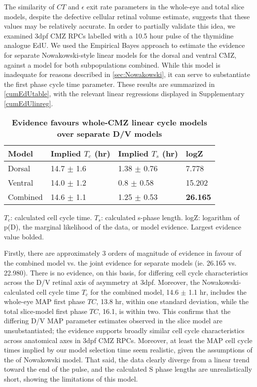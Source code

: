 The similarity of $CT$ and $\epsilon$ exit rate parameters in the whole-eye and total slice models, despite the defective cellular retinal volume estimate, suggests that these values may be relatively accurate. In order to partially validate this idea, we examined 3dpf CMZ RPCs labelled with a 10.5 hour pulse of the thymidine analogue EdU. We used the Empirical Bayes approach to estimate the evidence for separate Nowakowski-style \cite{Nowakowski1989} linear models for the dorsal and ventral CMZ, against a model for both subpopulations combined. While this model is inadequate for reasons described in \autoref{sec:Nowakowski}, it can serve to substantiate the first phase cycle time parameter. These results are summarized in \autoref{cumEdUtable}, with the relevant linear regressions displayed in Supplementary \autoref{cumEdUlinreg}.

\begin{table}[!ht]
    \centering
    \caption{{\bf Evidence favours whole-CMZ linear cycle models over separate D/V models}}
    \begin{tabular}{|l|l|l|l|} 
        \hline {\bf Model} & {\bf Implied $T_c$ (hr)} & {\bf Implied $T_s$ (hr)} & {\bf logZ}\\ \hline 
        Dorsal & 14.7 $\pm$ 1.6 & 1.38 $\pm$ 0.76 & 7.778\\ \hline 
        Ventral & 14.0 $\pm$ 1.2 & 0.8 $\pm$ 0.58 & 15.202\\ \hline
        Combined & 14.6 $\pm$ 1.1 & 1.25 $\pm$ 0.53 & {\bf26.165}\\ \hline
    \end{tabular}
   
    \begin{flushleft} $T_c$: calculated cell cycle time. $T_s$: calculated s-phase length. logZ: logarithm of p(D), the marginal likelihood of the data, or model evidence.  Largest evidence value bolded.
    \end{flushleft}
    \label{cumEdUtable}
\end{table}

Firstly, there are approximately 3 orders of magnitude of evidence in favour of the combined model vs. the joint evidence for separate models (ie. 26.165 vs. 22.980). There is no evidence, on this basis, for differing cell cycle characteristics across the D/V retinal axis of asymmetry at 3dpf. Moreover, the Nowakowski-calculated cell cycle time $T_c$ for the combined model, 14.6 $\pm$ 1.1 hr, includes the whole-eye MAP first phase $TC$, 13.8 hr, within one standard deviation, while the total slice-model first phase $TC$, 16.1, is within two. This confirms that the differing D/V MAP parameter estimates observed in the slice model are unsubstantiated; the evidence supports broadly similar cell cycle characteristics across anatomical axes in 3dpf CMZ RPCs. Moreover, at least the MAP cell cycle times implied by our model selection time seem realistic, given the assumptions of the of Nowakowski model. That said, the data clearly diverge from a linear trend toward the end of the pulse, and the calculated S phase lengths are unrealistically short, showing the limitations of this model.

